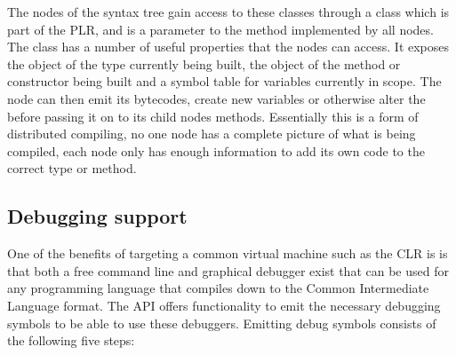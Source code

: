 	The nodes of the syntax tree gain access to these classes through a 
	 class which is part of the PLR, and is a parameter 
	to the  method implemented by all nodes. The 
	 class has a number of useful properties that the 
	nodes can access. It exposes the  object of the type 
	currently being built, the  object of the method or 
	constructor being built and a symbol table for variables currently in scope. 
	The node can then emit its bytecodes, create new variables or otherwise 
	alter the  before passing it on to its child nodes 
	 methods. Essentially this is a form of distributed 
	compiling, no one node has a complete picture of what is being compiled, 
	each node only has enough information to add its own code to the correct 
	type or method.

\subsection{Debugging support}\label{debug_support}
	
	One of the benefits of targeting a common virtual machine such as the CLR is
	is that both a free command line and graphical debugger exist that can be 
	used for any programming language that compiles down to the Common 
	Intermediate Language format. The  API offers 
	functionality to emit the necessary debugging symbols to be able to use 
	these debuggers. Emitting debug symbols consists of the following five steps:
 	
